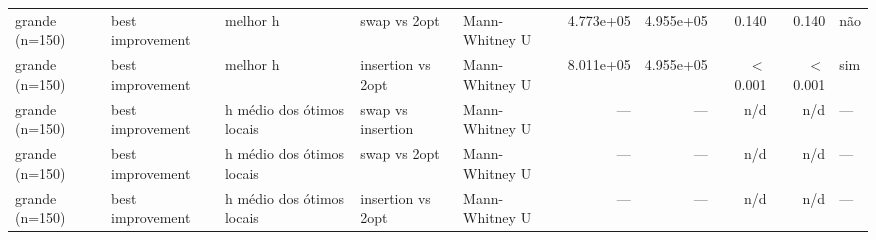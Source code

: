 \begin{table}[ht]
\begin{tabular}{lllllrrrrl}
grande (n=150) & best improvement & melhor h & swap vs 2opt & Mann-Whitney U & 4.773e+05 & 4.955e+05 & 0.140 & 0.140 & não \\
grande (n=150) & best improvement & melhor h & insertion vs 2opt & Mann-Whitney U & 8.011e+05 & 4.955e+05 & $<$0.001 & $<$0.001 & sim \\
grande (n=150) & best improvement & h médio dos ótimos locais & swap vs insertion & Mann-Whitney U & — & — & n/d & n/d & — \\
grande (n=150) & best improvement & h médio dos ótimos locais & swap vs 2opt & Mann-Whitney U & — & — & n/d & n/d & — \\
grande (n=150) & best improvement & h médio dos ótimos locais & insertion vs 2opt & Mann-Whitney U & — & — & n/d & n/d & — \\
\hline
\end{tabular}
\end{table}
